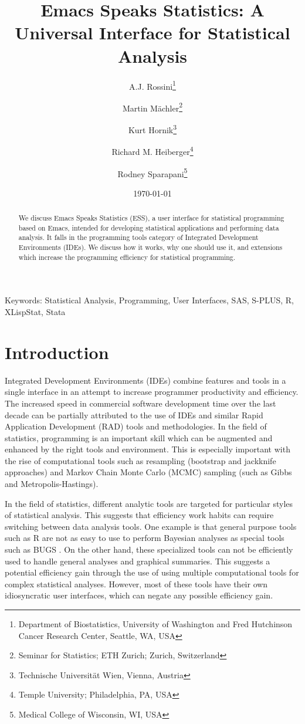 \documentclass{article}
\title{Emacs Speaks Statistics: A Universal Interface for
  Statistical Analysis}
\author{A.J. Rossini\footnote{Department of Biostatistics, University
    of Washington and Fred Hutchinson Cancer Research Center, Seattle,
    WA, USA} \and Martin M{\"a}chler\footnote{Seminar for Statistics;
    ETH Zurich; Zurich, Switzerland} \and Kurt
  Hornik\footnote{Technische Universit{\"a}t Wien, Vienna, Austria}
  \and Richard M. Heiberger\footnote{Temple University; Philadelphia,
    PA, USA} \and Rodney Sparapani\footnote{Medical College of
    Wisconsin, WI, USA}}
\date{\today}
\newif\ifpdf
\begin{document}
\ifpdf
  \DeclareGraphicsExtensions{.jpg,.pdf,.png,.mps}
\fi


\maketitle

Keywords: Statistical Analysis, Programming, User Interfaces, SAS,
S-PLUS, R, XLispStat, Stata

\begin{abstract}
  We discuss Emacs Speaks Statistics (ESS), a user interface for
  statistical programming based on Emacs, intended for developing
  statistical applications and performing data analysis.  It falls in
  the programming tools category of Integrated Development
  Environments (IDEs).  We discuss how it works, why one should use
  it, and extensions which increase the programming efficiency for
  statistical programming.
\end{abstract}

\section{Introduction}
\label{sec:intro}

Integrated Development Environments (IDEs) combine features and tools
in a single interface in an attempt to increase programmer
productivity and efficiency.  The increased speed in commercial
software development time over the last decade can be partially
attributed to the use of IDEs and similar Rapid Application
Development (RAD) tools and methodologies.  In the field of
statistics, programming is an important skill which can be augmented
and enhanced by the right tools and environment.  This is especially
important with the rise of computational tools such as resampling
(bootstrap and jackknife approaches) and Markov Chain Monte Carlo
(MCMC) sampling (such as Gibbs and Metropolis-Hastings).

In the field of statistics, different analytic tools are targeted for
particular styles of statistical analysis.  This suggests that
efficiency work habits can require switching between data analysis
tools.  One example is that general purpose tools such as R
\citep{ihak:gent:1996} are not as easy to use to perform Bayesian
analyses as special tools such as BUGS \citep{SpieThomBest:1999}.  On
the other hand, these specialized tools can not be efficiently used to
handle general analyses and graphical summaries.  This suggests a
potential efficiency gain through the use of using multiple
computational tools for complex statistical analyses.  However, most
of these tools have their own idiosyncratic user interfaces, which can
negate any possible efficiency gain.
\end{document}

